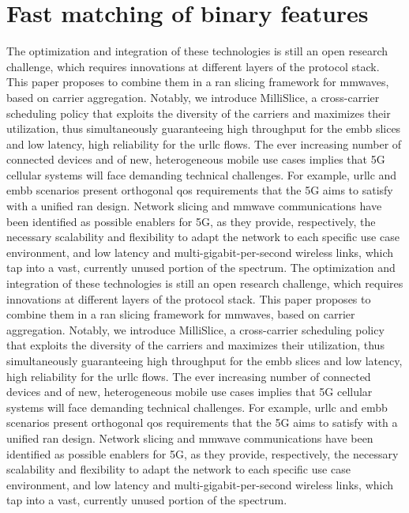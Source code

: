 \documentclass[a4paper, 12pt, oneside]{article}
\begin{document}
    \section*{Fast matching of binary features}
  The optimization and integration of these technologies is still an open research challenge, which requires innovations at different layers of the protocol stack. This paper proposes to combine them in a \gls{ran} slicing framework for \glspl{mmwave}, based on carrier aggregation. Notably, we introduce MilliSlice, a cross-carrier scheduling policy that exploits the diversity of the carriers and maximizes their utilization, thus simultaneously guaranteeing high throughput for the \gls{embb} slices and low latency, high reliability for the \gls{urllc} flows.
    The ever increasing number of connected devices and of new, heterogeneous mobile use cases implies that 5G cellular systems will face demanding technical challenges. For example, \gls{urllc} and \gls{embb} scenarios present orthogonal \gls{qos} requirements that the 5G aims to satisfy with a unified \gls{ran} design. Network slicing and \gls{mmwave} communications have been identified as possible enablers for 5G, as they provide, respectively, the necessary scalability and flexibility to adapt the network to each specific use case environment, and low latency and multi-gigabit-per-second wireless links, which tap into a vast, currently unused portion of the spectrum.
  The optimization and integration of these technologies is still an open research challenge, which requires innovations at different layers of the protocol stack. This paper proposes to combine them in a \gls{ran} slicing framework for \glspl{mmwave}, based on carrier aggregation. Notably, we introduce MilliSlice, a cross-carrier scheduling policy that exploits the diversity of the carriers and maximizes their utilization, thus simultaneously guaranteeing high throughput for the \gls{embb} slices and low latency, high reliability for the \gls{urllc} flows.
    The ever increasing number of connected devices and of new, heterogeneous mobile use cases implies that 5G cellular systems will face demanding technical challenges. For example, \gls{urllc} and \gls{embb} scenarios present orthogonal \gls{qos} requirements that the 5G aims to satisfy with a unified \gls{ran} design. Network slicing and \gls{mmwave} communications have been identified as possible enablers for 5G, as they provide, respectively, the necessary scalability and flexibility to adapt the network to each specific use case environment, and low latency and multi-gigabit-per-second wireless links, which tap into a vast, currently unused portion of the spectrum.
\end{document}

